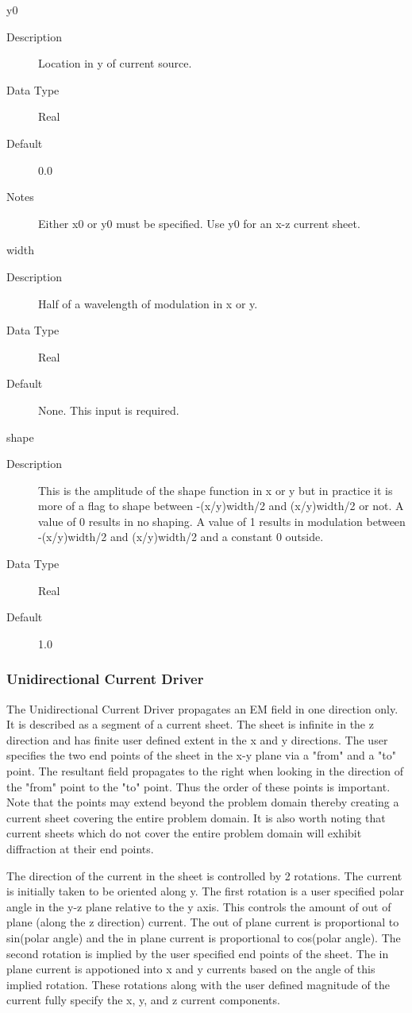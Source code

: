 \documentclass[11pt]{amsart}
\begin{document}
y0
\begin{description}
\item [Description] Location in y of current source.
\item [Data Type] Real
\item [Default] 0.0
\item [Notes] Either x0 or y0 must be specified.  Use y0 for an x-z current
sheet.
\end{description}

width
\begin{description}
\item [Description] Half of a wavelength of modulation in x or y.
\item [Data Type] Real
\item [Default] None.  This input is required.
\end{description}

shape
\begin{description}
\item [Description] This is the amplitude of the shape function in x or y but
in practice it is more of a flag to shape between -(x/y)width/2 and
(x/y)width/2 or not.  A value of 0 results in no shaping.  A value of 1 results
in modulation between -(x/y)width/2 and (x/y)width/2 and a constant 0 outside.
\item [Data Type] Real
\item [Default] 1.0
\end{description}

\subsubsection*{Unidirectional Current Driver}
The Unidirectional Current Driver propagates an EM field in one direction only.
It is described as a segment of a current sheet.  The sheet is infinite in the
z direction and has finite user defined extent in the x and y directions.  The
user specifies the two end points of the sheet in the x-y plane via a "from" and
a "to" point.  The resultant field propagates to the right when looking in the
direction of the "from" point to the "to" point.  Thus the order of these points
is important.  Note that the points may extend beyond the problem domain thereby
creating a current sheet covering the entire problem domain.  It is also worth
noting that current sheets which do not cover the entire problem domain will
exhibit diffraction at their end points.

The direction of the current in the sheet is controlled by 2 rotations.  The
current is initially taken to be oriented along y.  The first rotation is a user
specified polar angle in the y-z plane relative to the y axis.  This controls
the amount of out of plane (along the z direction) current.  The out of plane
current is proportional to sin(polar angle) and the in plane current is
proportional to cos(polar angle).  The second rotation is implied by the user
specified end points of the sheet.  The in plane current is appotioned into x
and y currents based on the angle of this implied rotation.  These rotations
along with the user defined magnitude of the current fully specify the x, y, and
z current components.
\end{document}
